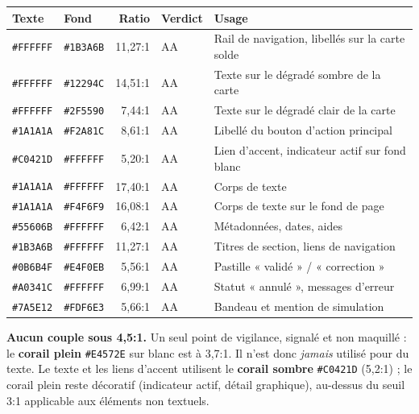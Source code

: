 \documentclass[11pt,a4paper]{article}
\newcommand{\hex}[1]{\texttt{\small #1}}
\begin{document}
\vspace{6pt}
{\footnotesize
\renewcommand{\arraystretch}{1.25}
\begin{longtable}{@{}l l r l p{5.1cm}@{}}
\toprule
\textbf{Texte} & \textbf{Fond} & \textbf{Ratio} & \textbf{Verdict} & \textbf{Usage}\\
\midrule
\endhead
\hex{\#FFFFFF} & \hex{\#1B3A6B} & 11{,}27:1 & AA & Rail de navigation, libellés sur la carte solde\\
\hex{\#FFFFFF} & \hex{\#12294C} & 14{,}51:1 & AA & Texte sur le dégradé sombre de la carte\\
\hex{\#FFFFFF} & \hex{\#2F5590} & 7{,}44:1 & AA & Texte sur le dégradé clair de la carte\\
\hex{\#1A1A1A} & \hex{\#F2A81C} & 8{,}61:1 & AA & Libellé du bouton d'action principal\\
\hex{\#C0421D} & \hex{\#FFFFFF} & 5{,}20:1 & AA & Lien d'accent, indicateur actif sur fond blanc\\
\hex{\#1A1A1A} & \hex{\#FFFFFF} & 17{,}40:1 & AA & Corps de texte\\
\hex{\#1A1A1A} & \hex{\#F4F6F9} & 16{,}08:1 & AA & Corps de texte sur le fond de page\\
\hex{\#55606B} & \hex{\#FFFFFF} & 6{,}42:1 & AA & Métadonnées, dates, aides\\
\hex{\#1B3A6B} & \hex{\#FFFFFF} & 11{,}27:1 & AA & Titres de section, liens de navigation\\
\hex{\#0B6B4F} & \hex{\#E4F0EB} & 5{,}56:1 & AA & Pastille « validé » / « correction »\\
\hex{\#A0341C} & \hex{\#FFFFFF} & 6{,}99:1 & AA & Statut « annulé », messages d'erreur\\
\hex{\#7A5E12} & \hex{\#FDF6E3} & 5{,}66:1 & AA & Bandeau et mention de simulation\\
\bottomrule
\end{longtable}}

\begin{bloc}
\textbf{Aucun couple sous 4,5:1.} Un seul point de vigilance, signalé et non
maquillé : le \textbf{corail plein} \hex{\#E4572E} sur blanc est à 3,7:1. Il
n'est donc \emph{jamais} utilisé pour du texte. Le texte et les liens d'accent
utilisent le \textbf{corail sombre} \hex{\#C0421D} (5,2:1) ; le corail plein
reste décoratif (indicateur actif, détail graphique), au-dessus du seuil 3:1
applicable aux éléments non textuels.
\end{bloc}
\newpage

\end{document}
